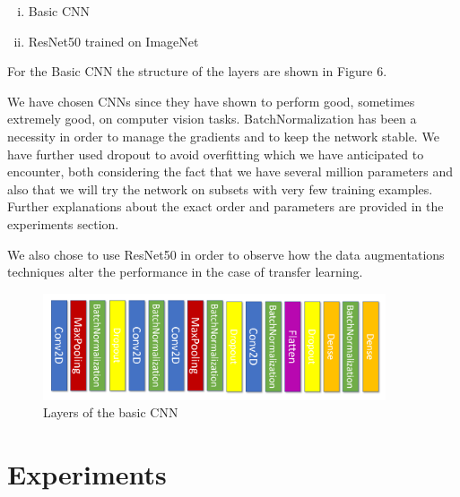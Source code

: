 \documentclass{article}
\begin{document}
\begin{enumerate}[(i)]
 \item Basic CNN
 \item ResNet50 trained on ImageNet
\end{enumerate}

For the Basic CNN the structure of the layers are shown in Figure 6.

We have chosen CNNs since they have shown to perform good, sometimes extremely good, on computer vision tasks. BatchNormalization has been a necessity in order to manage the gradients and to keep the network stable. We have further used dropout to avoid overfitting which we have anticipated to encounter, both considering the fact that we have several million parameters and also that we will try the network on subsets with very few training examples. Further explanations about the exact order and parameters are provided in the experiments section.

We also chose to use ResNet50 in order to observe how the data augmentations techniques alter the performance in the case of transfer learning.

\begin{figure}[H]
	\centering
	\includegraphics[width=0.9\textwidth]{conv.PNG}
	\caption{Layers of the basic CNN}
\end{figure}

\section{Experiments}

% 
\end{document}
